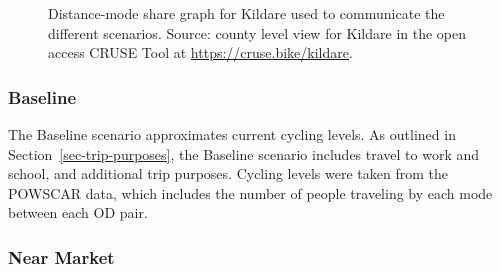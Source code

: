 \documentclass[
  super,
  preprint,
  3p]{elsarticle}
\providecommand{\DIFaddbeginFL}{} %
\providecommand{\DIFaddendFL}{} %
\providecommand{\DIFdelbeginFL}{} %
\providecommand{\DIFdelendFL}{} %
\newcommand{\DIFscaledelfig}{0.5}
\newlength{\DIFdelgraphicswidth} %
\newlength{\DIFdelgraphicsheight} %
\newcommand{\DIFaddincludegraphics}[2][]{{\color{blue}\fbox{\DIFOincludegraphics[#1]{#2}}}} %
\newcommand{\DIFdelincludegraphics}[2][]{%
\sbox{\DIFdelgraphicsbox}{\DIFOincludegraphics[#1]{#2}}%
\settoboxwidth{\DIFdelgraphicswidth}{\DIFdelgraphicsbox} %
\settoboxtotalheight{\DIFdelgraphicsheight}{\DIFdelgraphicsbox} %
\scalebox{\DIFscaledelfig}{%
\parbox[b]{\DIFdelgraphicswidth}{\usebox{\DIFdelgraphicsbox}\\[-\baselineskip] \rule{\DIFdelgraphicswidth}{0em}}\llap{\resizebox{\DIFdelgraphicswidth}{\DIFdelgraphicsheight}{%
\setlength{\unitlength}{\DIFdelgraphicswidth}%
\begin{picture}(1,1)%
\thicklines\linethickness{2pt} %
{\color[rgb]{1,0,0}\put(0,0){\framebox(1,1){}}}%
{\color[rgb]{1,0,0}\put(0,0){\line( 1,1){1}}}%
{\color[rgb]{1,0,0}\put(0,1){\line(1,-1){1}}}%
\end{picture}%
}\hspace*{3pt}}} %
} %
\DeclareRobustCommand{\DIFaddbeginFL}{\DIFOaddbeginFL \let\includegraphics\DIFaddincludegraphics} %
\DeclareRobustCommand{\DIFaddendFL}{\DIFOaddendFL \let\includegraphics\DIFOincludegraphics} %
\DeclareRobustCommand{\DIFdelbeginFL}{\DIFOdelbeginFL \let\includegraphics\DIFdelincludegraphics} %
\DeclareRobustCommand{\DIFdelendFL}{\DIFOaddendFL \let\includegraphics\DIFOincludegraphics} %
\begin{document}
\begin{figure}

\DIFdelbeginFL %


\DIFdelendFL \DIFaddbeginFL {}
\DIFaddendFL 

\caption{\label{fig-scenarios}Distance-mode share graph for Kildare used
to communicate the different scenarios. Source: county level view for
Kildare in the open access CRUSE Tool at
\url{https://cruse.bike/kildare}.}

\end{figure}%

\subsubsection{Baseline}\label{baseline}

The Baseline scenario approximates current cycling levels. As outlined
in Section~\ref{sec-trip-purposes}, the Baseline scenario includes
travel to work and school, and additional trip purposes. Cycling levels
were taken from the POWSCAR data, which includes the number of people
traveling by each mode between each OD pair.

\subsubsection{Near Market}\label{near-market}
\end{document}
